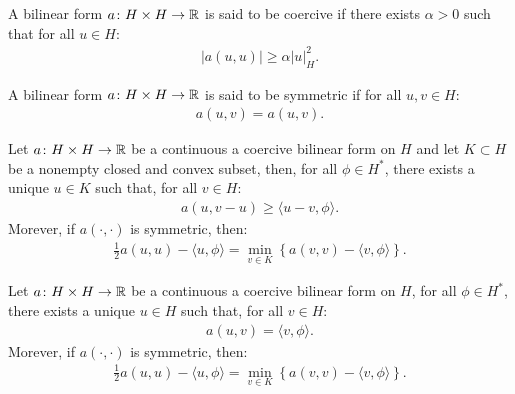 \begin{definition}
    A bilinear form $a \colon H \times H \rightarrow \mathbb{R}$ is said to be coercive if there exists $\alpha > 0$ such that for all $u \in H$:
    \begin{gather}
        \lvert a(u, u) \rvert \geq \alpha \lvert u \rvert_H^2.
    \end{gather}
\end{definition}

\begin{definition}
    A bilinear form $a \colon H \times H \rightarrow \mathbb{R}$ is said to be symmetric if for all $u, v \in H$:
    \begin{gather}
        a(u, v) = a(u, v).
    \end{gather}
\end{definition}

\begin{theorem}[Stampacchia]
    Let $a \colon H \times H \rightarrow \mathbb{R}$ be a continuous a coercive bilinear form on $H$ and let $K \subset H$ be a nonempty closed and convex subset, then, for all $\phi \in H^*$, there exists a unique $u \in K$ such that, for all $v \in H$:
    \begin{gather}
        a(u, v - u) \geq \langle u - v, \phi \rangle.
    \end{gather}
    Morever, if $a(\cdot, \cdot)$ is symmetric, then:
    \begin{gather}
        \frac{1}{2} a(u, u) - \langle u, \phi \rangle = \min_{v \in K} \left\{ a(v, v) - \langle v, \phi \rangle \right\}.
    \end{gather}
\end{theorem}

\begin{corollary}
    Let $a \colon H \times H \rightarrow \mathbb{R}$ be a continuous a coercive bilinear form on $H$, for all $\phi \in H^*$, there exists a unique $u \in H$ such that, for all $v \in H$:
    \begin{gather}
        a(u, v) = \langle v, \phi \rangle.
    \end{gather}
    Morever, if $a(\cdot, \cdot)$ is symmetric, then:
    \begin{gather}
        \frac{1}{2} a(u, u) - \langle u, \phi \rangle = \min_{v \in K} \left\{ a(v, v) - \langle v, \phi \rangle \right\}.
    \end{gather}
\end{corollary}

